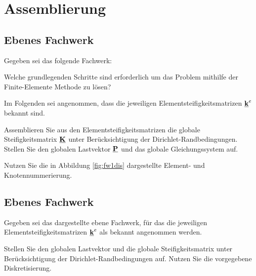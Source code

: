 \clearpage
\setcounter{page}{1}

\section{Assemblierung}


\subsection{Ebenes Fachwerk\label{subsec:assfw1}}

Gegeben sei das folgende Fachwerk:\medskip

\begin{minipage}[b]{0.4\textwidth}
  
  \label{fig:fachw1}
\end{minipage}
 \hfill
\begin{minipage}[b]{0.56\textwidth}
  
  \label{fig:fw1dis}
 \end{minipage}
 



\enab
\item Welche grundlegenden Schritte sind erforderlich um das Problem mithilfe der Finite-Elemente Methode zu lösen?
\enae

Im Folgenden sei angenommen, dass die jeweiligen Elementsteifigkeitsmatrizen $\underline{{\bm{\mathrm{k}}}}^e$ bekannt sind.

\enabres
\item Assemblieren Sie aus den Elementsteifigkeitsmatrizen die globale Steifigkeitsmatrix $\underline{{\bm{\mathrm{K}}}}$ unter Berücksichtigung der Dirichlet-Randbedingungen. 
 Stellen Sie den globalen Lastvektor $\underline{{\bm{\mathrm{P}}}}$ und das globale Gleichungssystem auf.
\enae

Nutzen Sie die in Abbildung \ref{fig:fw1dis} dargestellte Element- und Knotennummerierung. 





\subsection{Ebenes Fachwerk}

Gegeben sei das dargestellte ebene Fachwerk, für das die jeweiligen Elementsteifigkeitsmatrizen $\underline{{\bm{\mathrm{k}}}}^e$ als bekannt angenommen werden.\medskip


\begin{minipage}[b]{0.44\textwidth}
  
  \label{fig:fachw2}
\end{minipage}
\hfill
\begin{minipage}[b]{0.5\textwidth}
   
  \label{fig:fw2dis}
 \end{minipage}\medskip

Stellen Sie den globalen Lastvektor und die globale Steifigkeitsmatrix unter Berücksichtigung der Dirichlet-Randbedingungen auf.
Nutzen Sie die vorgegebene Diskretisierung.
